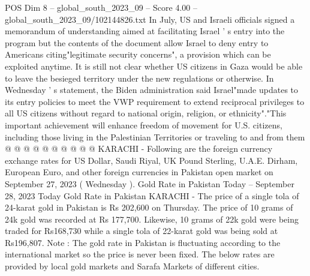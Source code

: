 \begin{textsample}{POS Dim 8 – global\_south\_2023\_09 – Score 4.00 – global\_south\_2023\_09/102144826.txt}
In July, US and Israeli officials signed a memorandum of understanding aimed at facilitating Israel ' s entry into the program but the contents of the document allow Israel to deny entry to Americans citing"legitimate security concerns", a provision which can be exploited anytime.
It is still not clear whether US citizens in Gaza would be able to leave the besieged territory under the new regulations or otherwise.
In Wednesday ' s statement, the Biden administration said Israel"made updates to its entry policies to meet the VWP requirement to extend reciprocal privileges to all US citizens without regard to national origin, religion, or ethnicity"."This important achievement will enhance freedom of movement for U.S. citizens, including those living in the Palestinian Territories or traveling to and from them @ @ @ @ @ @ @ @ @ @ KARACHI - Following are the foreign currency exchange rates for US Dollar, Saudi Riyal, UK Pound Sterling, U.A.E.
Dirham, European Euro, and other foreign currencies in Pakistan open market on September 27, 2023 ( Wednesday ).
Gold Rate in Pakistan Today -- September 28, 2023 Today Gold Rate in Pakistan KARACHI - The price of a single tola of 24-karat gold in Pakistan is Rs 202,600 on Thursday.
The price of 10 grams of 24k gold was recorded at Rs 177,700.
Likewise, 10 grams of 22k gold were being traded for Rs168,730 while a single tola of 22-karat gold was being sold at Rs196,807.
Note : The gold rate in Pakistan is fluctuating according to the international market so the price is never been fixed.
The below rates are provided by local gold markets and Sarafa Markets of different cities.

\end{textsample}
